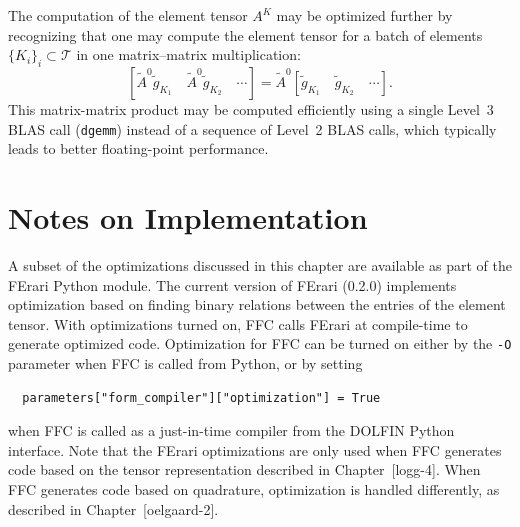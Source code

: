The computation of the element tensor $A^K$ may be optimized further
by recognizing that one may compute the element tensor for a batch of
elements $\{K_i\}_i \subset \mathcal{T}$ in one matrix--matrix
multiplication:
\begin{displaymath}
  \left[\tilde{A}^0 \tilde{g}_{K_1} \quad \tilde{A}^0 \tilde{g}_{K_2} \quad \cdots \right] =
  \tilde{A}^0 \left[\tilde{g}_{K_1} \quad \tilde{g}_{K_2} \quad \cdots\right].
\end{displaymath}
This matrix-matrix product may be computed efficiently using a single
Level~3 BLAS call (\texttt{dgemm}) instead of a sequence of Level~2
BLAS calls, which typically leads to better floating-point
performance.

\section{Notes on Implementation}

A subset of the optimizations discussed in this chapter are available
as part of the FErari Python module. The current version of FErari
(0.2.0) implements optimization based on finding binary relations
between the entries of the element tensor. With optimizations turned
on, FFC calls FErari at compile-time to generate optimized
code. Optimization for FFC can be turned on either by the \texttt{-O}
parameter when FFC is called from Python, or by setting
\begin{verbatim}
  parameters["form_compiler"]["optimization"] = True
\end{verbatim}
when FFC is called as a just-in-time compiler from the DOLFIN Python
interface. Note that the FErari optimizations are only used when FFC
generates code based on the tensor representation described in
Chapter~[logg-4]. When FFC generates code based on quadrature,
optimization is handled differently, as described in
Chapter~[oelgaard-2].
